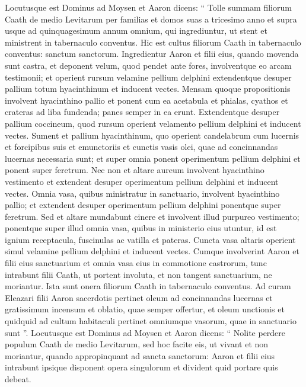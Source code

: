 \begin{biblechapter}
\begin{biblechapter}
\begin{biblechapter}
\begin{biblechapter}
\verse Locutusque est Dominus ad Moysen et Aaron dicens: 
\verse “ Tolle summam filiorum Caath de medio Levitarum per familias et domos suas 
\verse a tricesimo anno et supra usque ad quinquagesimum annum omnium, qui ingrediuntur, ut stent et ministrent in tabernaculo conventus. 
\verse Hic est cultus filiorum Caath in tabernaculo conventus: sanctum sanctorum. 
\verse Ingredientur Aaron et filii eius, quando movenda sunt castra, et deponent velum, quod pendet ante fores, involventque eo arcam testimonii; 
\verse et operient rursum velamine pellium delphini extendentque desuper pallium totum hyacinthinum et inducent vectes. 
 \verse Mensam quoque propositionis involvent hyacinthino pallio et ponent cum ea acetabula et phialas, cyathos et crateras ad liba fundenda; panes semper in ea erunt. 
\verse Extendentque desuper pallium coccineum, quod rursum operient velamento pellium delphini et inducent vectes. 
\verse Sument et pallium hyacinthinum, quo operient candelabrum cum lucernis et forcipibus suis et emunctoriis et cunctis vasis olei, quae ad concinnandas lucernas necessaria sunt; 
\verse et super omnia ponent operimentum pellium delphini et ponent super feretrum. 
\verse Nec non et altare aureum involvent hyacinthino vestimento et extendent desuper operimentum pellium delphini et inducent vectes. 
\verse Omnia vasa, quibus ministratur in sanctuario, involvent hyacinthino pallio; et extendent desuper operimentum pellium delphini ponentque super feretrum. 
\verse Sed et altare mundabunt cinere et involvent illud purpureo vestimento; 
\verse ponentque super illud omnia vasa, quibus in ministerio eius utuntur, id est ignium receptacula, fuscinulas ac vatilla et pateras. Cuncta vasa altaris operient simul velamine pellium delphini et inducent vectes. 
\verse Cumque involverint Aaron et filii eius sanctuarium et omnia vasa eius in commotione castrorum, tunc intrabunt filii Caath, ut portent involuta, et non tangent sanctuarium, ne moriantur. Ista sunt onera filiorum Caath in tabernaculo conventus. 
\verse Ad curam Eleazari filii Aaron sacerdotis pertinet oleum ad concinnandas lucernas et gratissimum incensum et oblatio, quae semper offertur, et oleum unctionis et quidquid ad cultum habitaculi pertinet omniumque vasorum, quae in sanctuario sunt ”.
 \verse Locutusque est Dominus ad Moysen et Aaron dicens: 
\verse “ Nolite perdere populum Caath de medio Levitarum, 
\verse sed hoc facite eis, ut vivant et non moriantur, quando appropinquant ad sancta sanctorum: Aaron et filii eius intrabunt ipsique disponent opera singulorum et divident quid portare quis debeat. 

\end{biblechapter}
\end{biblechapter}
\end{biblechapter}
\end{biblechapter}
